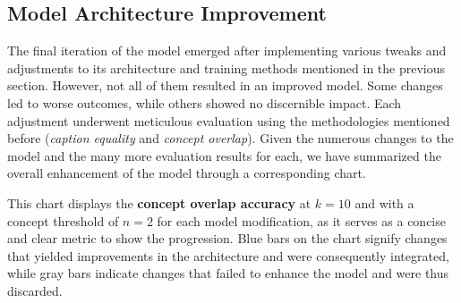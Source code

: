 \documentclass[10pt,twocolumn,letterpaper]{article}
\begin{document}
\subsection{Model Architecture Improvement}

The final iteration of the model emerged after implementing various tweaks and adjustments to its architecture and training methods mentioned in the previous section. However, not all of them resulted in an improved model. Some changes led to worse outcomes, while others showed no discernible impact. Each adjustment underwent meticulous evaluation using the methodologies mentioned before (\textit{caption equality} and \textit{concept overlap}). Given the numerous changes to the model and the many more evaluation results for each, we have summarized the overall enhancement of the model through a corresponding chart.

This chart displays the \textbf{concept overlap accuracy} at $k=10$ and with a concept threshold of $n=2$ for each model modification, as it serves as a concise and clear metric to show the progression. Blue bars on the chart signify changes that yielded improvements in the architecture and were consequently integrated, while gray bars indicate changes that failed to enhance the model and were thus discarded.
\end{document}
